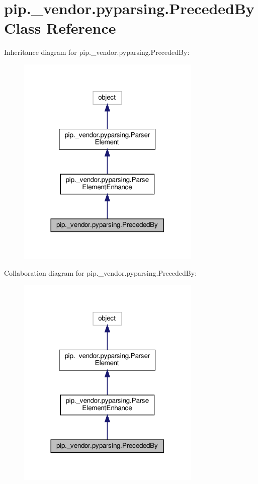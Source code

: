 \hypertarget{classpip_1_1__vendor_1_1pyparsing_1_1PrecededBy}{}\section{pip.\+\_\+vendor.\+pyparsing.\+Preceded\+By Class Reference}
\label{classpip_1_1__vendor_1_1pyparsing_1_1PrecededBy}


Inheritance diagram for pip.\+\_\+vendor.\+pyparsing.\+Preceded\+By\+:
\nopagebreak
\begin{figure}[H]
\begin{center}
\leavevmode
\includegraphics[width=248pt]{classpip_1_1__vendor_1_1pyparsing_1_1PrecededBy__inherit__graph}
\end{center}
\end{figure}


Collaboration diagram for pip.\+\_\+vendor.\+pyparsing.\+Preceded\+By\+:
\nopagebreak
\begin{figure}[H]
\begin{center}
\leavevmode
\includegraphics[width=248pt]{classpip_1_1__vendor_1_1pyparsing_1_1PrecededBy__coll__graph}
\end{center}
\end{figure}
